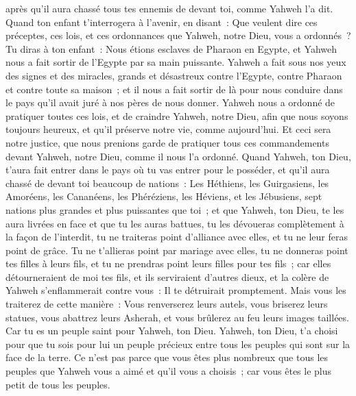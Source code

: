 \begin{multicols}{2}
après qu'il aura chassé tous tes ennemis de devant toi, comme Yahweh l'a dit.
Quand ton enfant t'interrogera à l'avenir, en disant~: Que veulent dire ces préceptes, ces lois, et ces ordonnances que Yahweh, notre Dieu, vous a ordonnés~?
Tu diras à ton enfant~: Nous étions esclaves de Pharaon en Egypte, et Yahweh nous a fait sortir de l'Egypte par sa main puissante.
Yahweh a fait sous nos yeux des signes et des miracles, grands et désastreux contre l'Egypte, contre Pharaon et contre toute sa maison~;
et il nous a fait sortir de là pour nous conduire dans le pays qu'il avait juré à nos pères de nous donner.
Yahweh nous a ordonné de pratiquer toutes ces lois, et de craindre Yahweh, notre Dieu, afin que nous soyons toujours heureux, et qu'il préserve notre vie, comme aujourd'hui.
Et ceci sera notre justice, que nous prenions garde de pratiquer tous ces commandements devant Yahweh, notre Dieu, comme il nous l'a ordonné.
\VerseOne{}Quand Yahweh, ton Dieu, t'aura fait entrer dans le pays où tu vas entrer pour le posséder, et qu'il aura chassé de devant toi beaucoup de nations~: Les Héthiens, les Guirgasiens, les Amoréens, les Cananéens, les Phéréziens, les Héviens, et les Jébusiens, sept nations plus grandes et plus puissantes que toi~;
et que Yahweh, ton Dieu, te les aura livrées en face et que tu les auras battues, tu les dévoueras complètement à la façon de l'interdit, tu ne traiteras point d'alliance avec elles, et tu ne leur feras point de grâce.
Tu ne t'allieras point par mariage avec elles, tu ne donneras point tes filles à leurs fils, et tu ne prendras point leurs filles pour tes fils~;
car elles détourneraient de moi tes fils, et ils serviraient d'autres dieux, et la colère de Yahweh s'enflammerait contre vous~: Il te détruirait promptement.
Mais vous les traiterez de cette manière~: Vous renverserez leurs autels, vous briserez leurs statues, vous abattrez leurs Asherah, et vous brûlerez au feu leurs images taillées.
Car tu es un peuple saint pour Yahweh, ton Dieu. Yahweh, ton Dieu, t'a choisi pour que tu sois pour lui un peuple précieux entre tous les peuples qui sont sur la face de la terre.
Ce n'est pas parce que vous êtes plus nombreux que tous les peuples que Yahweh vous a aimé et qu'il vous a choisis~; car vous êtes le plus petit de tous les peuples.

\end{multicols}

